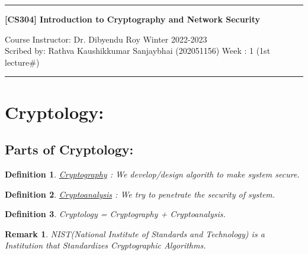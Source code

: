 \documentclass[11pt]{article}
\newtheorem{definition}{Definition}
\newtheorem{remark}{Remark}
\begin{document}

\noindent
\rule{\textwidth}{1pt}
\begin{center}
{\bf [CS304] Introduction to Cryptography and Network Security}
\end{center}
Course Instructor: Dr. Dibyendu Roy \hfill Winter 2022-2023\\
Scribed by: Rathva Kaushikkumar Sanjaybhai (202051156) \hfill Week : 1 (1st lecture\#)
\\
\rule{\textwidth}{1pt}


\section[short]{Cryptology:}
\subsection{Parts of Cryptology:}

\begin{definition}
\underline{{Cryptography}} : 
We develop/design algorith to make system secure.  
\end{definition}

\begin{definition}
    \underline{{Cryptoanalysis}} : We try to penetrate the security of system.

\end{definition}

\begin{definition}
    {Cryptology = Cryptography + Cryptoanalysis.}    
\end{definition}

\begin{remark}
    {NIST}(National Institute of Standards and Technology) 
    is a Institution that Standardizes Cryptographic Algorithms.    
\end{remark}    
\end{document}

